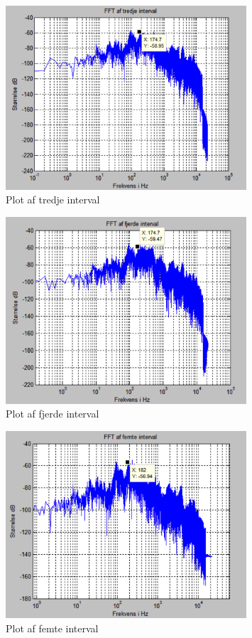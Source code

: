 \begin{figure}[H]
	\centering
	\includegraphics[width=0.8\textwidth]{Figur/Snip20151201_9}
	\caption{Plot af tredje interval}
\end{figure}

\begin{figure}[H]
	\centering
	\includegraphics[width=0.8\textwidth]{Figur/Snip20151201_10}
	\caption{Plot af fjerde interval}
\end{figure}

\begin{figure}[H]
	\centering
	\includegraphics[width=0.8\textwidth]{Figur/Snip20151201_11}
	\caption{Plot af femte interval}
\end{figure}

